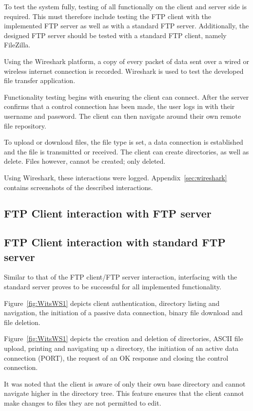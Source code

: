 \documentclass[10pt,twocolumn]{witseiepaper}
\begin{document}
To test the system fully, testing of all functionally on the client and server side is required. This must therefore include testing the FTP client with the implemented FTP server as well as with a standard FTP server. Additionally, the designed FTP server should be tested with a standard FTP client, namely FileZilla.

Using the Wireshark platform, a copy of every packet of data sent over a wired or wireless internet connection is recorded. Wireshark is used to test the developed file transfer application.

Functionality testing begins with ensuring the client can connect. After the server confirms that a control connection has been made, the user logs in with their username and password. The client can then navigate around their own remote file repository. 

To upload or download files, the file type is set, a data connection is established and the file is transmitted or received. The client can create directories, as well as delete. Files however, cannot be created;  only deleted.

Using Wireshark, these interactions were logged. Appendix~\ref{sec:wireshark} contains screenshots of the described interactions. 

\subsection{FTP Client interaction with FTP server}

\subsection{FTP Client interaction with standard FTP server}

Similar to that of the FTP client/FTP server interaction, interfacing with the standard server proves to be successful for all implemented functionality. 

Figure~\ref{fig:WitsWS1} depicts client authentication, directory listing and navigation, the initiation of a passive data connection, binary file download and file deletion. 

Figure~\ref{fig:WitsWS1} depicts the creation and deletion of directories, ASCII file upload, printing and navigating up a directory, the initiation of an active data connection (PORT), the request of an OK response and closing the control connection.

It was noted that the client is aware of only their own base directory and cannot navigate higher in the directory tree. This feature ensures that the client cannot make changes to files they are not permitted to edit.
\end{document}
